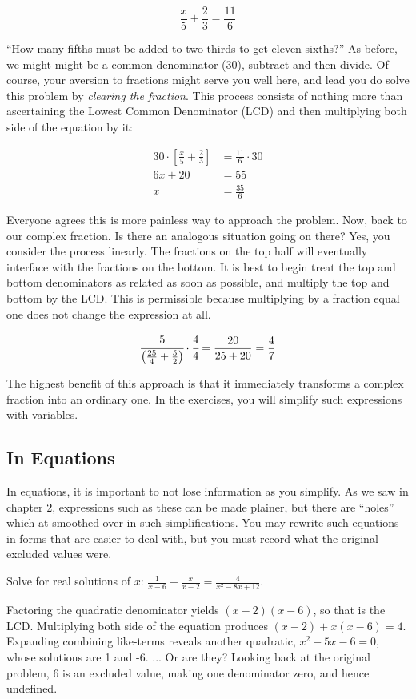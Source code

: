 \begin{equation}
\frac{x}{5}+\frac{2}{3}=\frac{11}{6}
\end{equation}

``How many fifths must be added to two-thirds to get eleven-sixths?''  As before, we might might
be a common denominator (30), subtract and then divide.  Of course, your aversion to fractions
might serve you well here, and lead you do solve this problem by \emph{clearing the fraction}.
This process consists of nothing more than ascertaining the Lowest Common Denominator (LCD)
and then multiplying both side of the equation by it:

\begin{align*}
30\cdot\left[\frac{x}{5}+\frac{2}{3}\right] &= \frac{11}{6}\cdot30\\
6x+20 &= 55\\
x &=\frac{35}{6}
\end{align*}

Everyone agrees this is more painless way to approach the problem.  Now, back to our
complex fraction.  Is there an analogous situation going on there?  Yes, you consider the
process linearly.  The fractions on the top half will eventually interface with the fractions on 
the bottom.  It is best to begin treat the top and bottom denominators as related as soon
as possible, and multiply the top and bottom by the LCD.  This is permissible because 
multiplying by a fraction equal one does not change the expression at all.

$$\cfrac{5}{\left(\frac{25}{4}+\frac{5}{2}\right)}\cdot\cfrac{4}{4}=\frac{20}{25+20}=\frac{4}{7}$$

The highest benefit of this approach is that it immediately transforms a complex fraction 
into an ordinary one.  In the exercises, you will simplify such expressions with variables.

\subsection{In Equations}
In equations, it is important to not lose information as you simplify.  As we saw in chapter 2,
expressions such as these can be made plainer, but there are ``holes'' which at smoothed 
over in such simplifications.  You may rewrite such equations in forms that are easier to
deal with, but you must record what the original excluded values were.

\begin{example}
\exProblem
Solve for real solutions of $x$: $\frac{1}{x-6}+\frac{x}{x-2}=\frac{4}{x^2-8x+12}$.

\exSolution
Factoring the quadratic denominator yields $(x-2)(x-6)$, so that is the LCD.  Multiplying
both side of the equation produces $(x-2) + x(x-6)=4$.  Expanding combining like-terms
reveals another quadratic, $x^2-5x-6=0$, whose solutions are 1 and -6. ... Or are they?
Looking back at the original problem, 6 is an excluded value, making one denominator
zero, and hence undefined.
\end{example}

